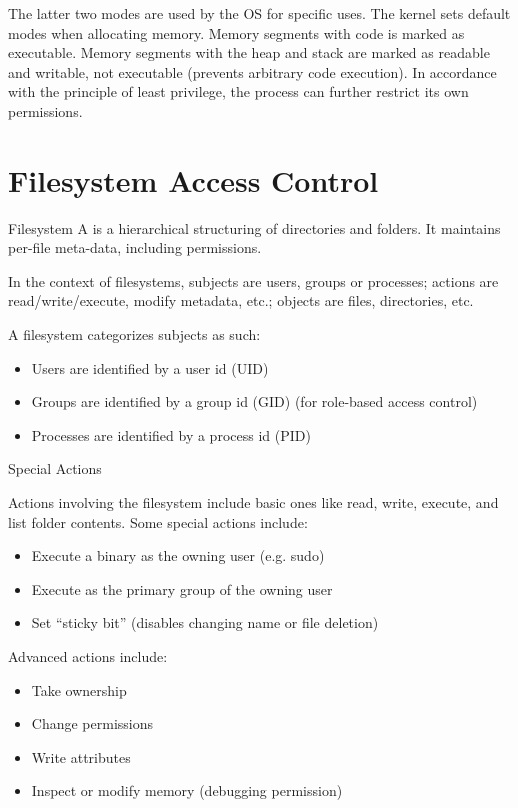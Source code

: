 \documentclass[code]{amznotes}
\begin{document}
The latter two modes are used by the OS for specific uses. The kernel sets default modes when allocating memory. Memory segments with code is marked as executable. Memory segments with the heap and stack are marked as readable and writable, not executable (prevents arbitrary code execution). In accordance with the principle of least privilege, the process can further restrict its own permissions.

\section{Filesystem Access Control}

\begin{dfnbox}{Filesystem}{}
    A  is a hierarchical structuring of directories and folders. It maintains per-file meta-data, including permissions.
\end{dfnbox}

In the context of filesystems, subjects are users, groups or processes; actions are read/write/execute, modify metadata, etc.; objects are files, directories, etc.

A filesystem categorizes subjects as such:
\begin{itemize}[noitemsep]
    \item Users are identified by a user id (UID)
    \item Groups are identified by a group id (GID) (for role-based access control)
    \item Processes are identified by a process id (PID)
\end{itemize}

\begin{dfnbox}{Special Actions}{}

\end{dfnbox}

Actions involving the filesystem include basic ones like read, write, execute, and list folder contents. Some special actions include:
\begin{itemize}[noitemsep]
    \item Execute a binary as the owning user (e.g. sudo)
    \item Execute as the primary group of the owning user
    \item Set ``sticky bit'' (disables changing name or file deletion)
\end{itemize}

Advanced actions include:
\begin{itemize}[noitemsep]
    \item Take ownership
    \item Change permissions
    \item Write attributes
    \item Inspect or modify memory (debugging permission)
\end{itemize}
\end{document}
